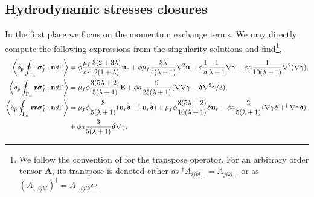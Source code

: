 

\subsection{Hydrodynamic stresses closures}
\label{sec:hydro_closure}





In the first place we focus on the momentum exchange terms. 
We may directly compute the following expressions from the singularity solutions and find\footnote{
    We follow the convention of \citet{happel2012low} for the transpose operator.
    For an arbitrary order tensor \textbf{A}, its transpose is denoted either as $^\dagger A_{ijkl\ldots} = A_{jikl\ldots}$ or as $ (A_{\ldots ijkl})^\dagger = A_{\ldots ijlk}$}, 
\begin{align}
    \pSavg{\bm\sigma_f^*\cdot \textbf{n}} &
    =
    \phi
    \frac{\mu_f}{a^2}
    \frac{3(2+3\lambda)}{2(1+\lambda)}\textbf{u}_r
    + \phi\mu_f  \frac{3\lambda}{4(\lambda +1)} \grad^2 \textbf{u}%
    + \phi \frac{1}{a}\frac{1}{\lambda +1} \grad \gamma
    + \phi a \frac{1}{10(\lambda +1)}\grad^2(\grad\gamma),
    \label{eq:drag_forces}
    \\
    \pSavg{\textbf{r}\bm\sigma_f^*\cdot \textbf{n}} &
    = \mu_f \phi 
    \frac{3(5\lambda +2)}{5(\lambda +1)}\textbf{E}
    + \phi a \frac{9}{25(\lambda +1)}(\grad\grad \gamma- \bm\delta\grad^2 \gamma/3),
    \label{eq:first_mom}
    \\
    \pSavg{\textbf{rr}\bm\sigma_f^*\cdot \textbf{n}} &
    =
    \mu_f \phi \frac{3}{5(\lambda +1)} (\textbf{u}_r \bm\delta + ^\dagger\textbf{u}_r\bm\delta )
    + \mu_f \phi \frac{3(5\lambda +2)}{10(\lambda+1)}\bm\delta \textbf{u}_r
    - \phi a\frac{2}{5(\lambda+1)}(\grad \gamma \bm\delta+  ^\dagger \grad \gamma\bm\delta)
    \nonumber\\&
    + \phi a\frac{3}{5(\lambda+1)} \bm\delta \grad \gamma,
    \label{eq:second_mom1}
\end{align}
